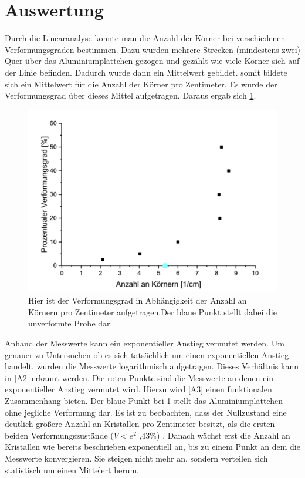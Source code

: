\documentclass[
	a4paper,
	12pt,
	pagesize,
	ngerman
]{scrartcl}
\begin{document}
\section{Auswertung}
Durch die Linearanalyse konnte man die Anzahl der Körner bei verschiedenen Verformungsgraden bestimmen. Dazu wurden mehrere Strecken (mindestens zwei) Quer über das Aluminiumplättchen gezogen und gezählt wie viele Körner sich auf der Linie befinden. Dadurch wurde dann ein Mittelwert gebildet. somit bildete sich ein Mittelwert für die Anzahl der Körner pro Zentimeter. Es wurde der Verformungsgrad über dieses Mittel aufgetragen.
Daraus ergab sich \cref{A1}.
\begin{figure}[h!]
    \centering
    \includegraphics[scale = 0.3]{nichtln.png}
    \caption{Hier ist der Verformungsgrad in Abhängigkeit der Anzahl an Körnern pro Zentimeter aufgetragen.Der blaue Punkt stellt dabei die unverformte Probe dar.}
    \label{A1}
\end{figure}
Anhand der Messwerte kann ein exponentieller Anstieg vermutet werden. Um genauer zu Untersuchen ob es sich tatsächlich um einen exponentiellen Anstieg handelt, wurden die Messwerte logarithmisch aufgetragen. Dieses Verhältnis kann in \cref{A2} erkannt werden. Die roten Punkte sind die Messwerte an denen ein exponentieller Anstieg vermutet wird. Hierzu wird \cref{A3} einen funktionalen Zusammenhang bieten. Der blaue Punkt bei \cref{A1} stellt das Aluminiumplättchen ohne jegliche Verformung dar. Es ist zu beobachten, dass der Nullzustand eine deutlich größere Anzahl an Kristallen pro Zentimeter besitzt, als die ersten beiden Verformungszustände ($V<e^2$ ,43\%) . Danach wächst erst die Anzahl an Kristallen wie bereits beschrieben exponentiell an, bis zu einem Punkt an dem die Messwerte konvergieren. Sie steigen nicht mehr an, sondern verteilen sich statistisch um einen Mittelert herum.
\end{document}

